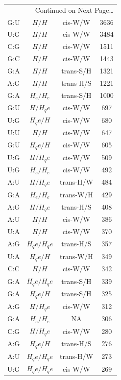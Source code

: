 \begin{center}
\begin{longtable}{c|c|c|c}
\multicolumn{4}{r}{Continued on Next Page\ldots} \\
\endfoot
\endlastfoot
G:U & $H/H$ & cis-W/W & 3636 \\  \hline
U:G & $H/H$ & cis-W/W & 3484 \\  \hline
C:G & $H/H$ & cis-W/W & 1511 \\  \hline
G:C & $H/H$ & cis-W/W & 1443 \\  \hline
G:A & $H/H$ & trans-S/H & 1321 \\  \hline
A:G & $H/H$ & trans-H/S & 1221 \\  \hline
G:A & $H_e/H_e$ & trans-S/H & 1000 \\  \hline
G:U & $H/H_qe$ & cis-W/W & 697 \\  \hline
U:G & $H_qe/H$ & cis-W/W & 680 \\  \hline
U:U & $H/H$ & cis-W/W & 647 \\  \hline
G:U & $H_qe/H$ & cis-W/W & 605 \\  \hline
U:G & $H/H_qe$ & cis-W/W & 509 \\  \hline
U:G & $H_e/H_e$ & cis-W/W & 492 \\  \hline
A:U & $H/H_qe$ & trans-H/W & 484 \\  \hline
G:A & $H_e/H_e$ & trans-W/H & 429 \\  \hline
A:G & $H/H_qe$ & trans-H/S & 408 \\  \hline
A:U & $H/H$ & cis-W/W & 386 \\  \hline
U:A & $H/H$ & cis-W/W & 370 \\  \hline
A:G & $H_qe/H_qe$ & trans-H/S & 357 \\  \hline
U:A & $H_qe/H$ & trans-W/H & 349 \\  \hline
C:C & $H/H$ & cis-W/W & 342 \\  \hline
G:A & $H_qe/H_qe$ & trans-S/H & 339 \\  \hline
G:A & $H_qe/H$ & trans-S/H & 325 \\  \hline
A:G & $H/H_qe$ & cis-W/W & 312 \\  \hline
G:A & $H_e/H_e$ & NA & 306 \\  \hline
C:G & $H/H_qe$ & cis-W/W & 280 \\  \hline
A:G & $H_qe/H$ & trans-H/S & 276 \\  \hline
A:U & $H_qe/H_qe$ & trans-H/W & 273 \\  \hline
U:G & $H_qe/H_qe$ & cis-W/W & 269 \\  \hline

\end{longtable}
\end{center}
